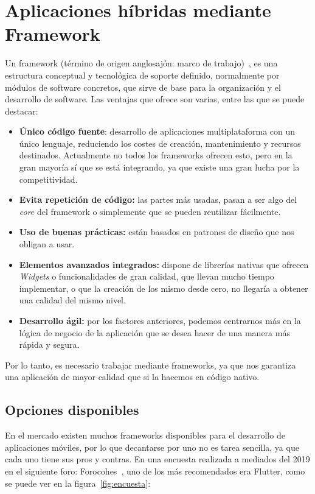 \section{Aplicaciones híbridas mediante Framework}
Un framework (término de origen anglosajón: marco de trabajo)~\cite{wiki:framework}, es una estructura conceptual y tecnológica de soporte definido, normalmente por módulos de software concretos, que sirve de base para la organización y el desarrollo de software. Las ventajas que ofrece son varias, entre las que se puede destacar:

\begin{itemize}
	\item \textbf{Único código fuente}: desarrollo de aplicaciones multiplataforma con un único lenguaje, reduciendo los costes de creación, mantenimiento y recursos destinados. Actualmente no todos los frameworks ofrecen esto, pero en la gran mayoría sí que se está integrando, ya que existe una gran lucha por la competitividad.
	\item \textbf{Evita repetición de código:} las partes más usadas, pasan a ser algo del \emph{core} del framework o simplemente que se pueden reutilizar fácilmente. 
	\item \textbf{Uso de buenas prácticas:} están basados en patrones de diseño que nos obligan a usar.
	\item \textbf{Elementos avanzados integrados:} dispone de librerías nativas que ofrecen \emph{Widgets} o funcionalidades de gran calidad, que llevan mucho tiempo implementar, o que la creación de los mismo desde cero, no llegaría a obtener una calidad del mismo nivel.
	\item \textbf{Desarrollo ágil:} por los factores anteriores, podemos centrarnos más en la lógica de negocio de la aplicación que se desea hacer de una manera más rápida y segura.
\end{itemize}

Por lo tanto, es necesario trabajar mediante frameworks, ya que nos garantiza una aplicación de mayor calidad que si la hacemos en código nativo.

\subsection{Opciones disponibles}
En el mercado existen muchos frameworks disponibles para el desarrollo de aplicaciones móviles, por lo que decantarse por uno no es tarea sencilla, ya que cada uno tiene sus pros y contras. En una encuesta realizada a mediados del 2019 en el siguiente foro: Forocohes~\cite{foro:encuesta}, uno de los más recomendados era Flutter, como se puede ver en la figura~\ref{fig:encuesta}:

